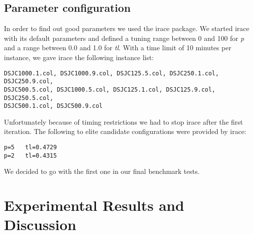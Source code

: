 \documentclass[a4paper]{scrartcl}
\begin{document}
\subsection{Parameter configuration}

In order to find out good parameters we used the irace package\cite{lopez2011irace}. We started irace with its default parameters and defined a tuning range between 0 and 100 for \emph{p} and a range between 0.0 and 1.0 for \emph{tl}.
With a time limit of 10 minutes per instance, we gave irace the following instance list:
\begin{verbatim}
DSJC1000.1.col, DSJC1000.9.col, DSJC125.5.col, DSJC250.1.col, DSJC250.9.col,
DSJC500.5.col, DSJC1000.5.col, DSJC125.1.col, DSJC125.9.col, DSJC250.5.col,
DSJC500.1.col, DSJC500.9.col
\end{verbatim}

Unfortunately because of timing restrictions we had to stop irace after the first iteration. The following to elite candidate configurations were provided by irace:

\begin{verbatim}
p=5   tl=0.4729
p=2   tl=0.4315
\end{verbatim}

We decided to go with the first one in our final benchmark tests.


\section{Experimental Results and Discussion}









\end{document}
